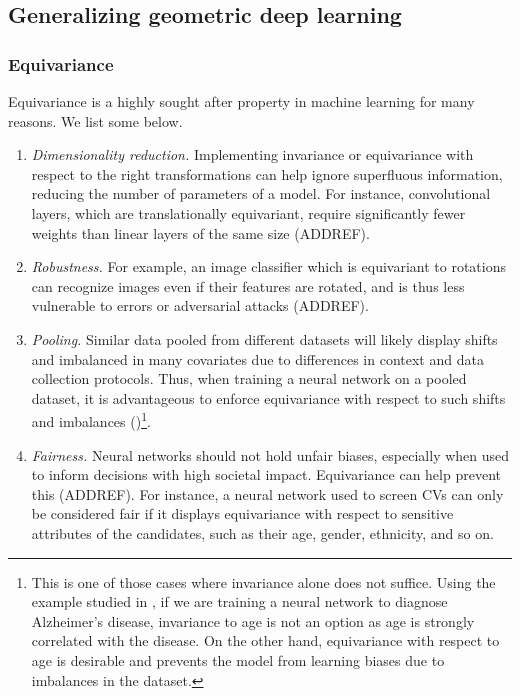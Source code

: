 \documentclass[12pt,a4paper,openright,twoside]{report}
\theoremstyle{plain}
\theoremstyle{definition}
\begin{document}
\subsection{Generalizing geometric deep learning}

\subsubsection{Equivariance}

Equivariance is a highly sought after property in machine learning for many reasons. We list some below.
\begin{enumerate}
  \item \textit{Dimensionality reduction.} Implementing invariance or equivariance with respect to the right transformations can help ignore superfluous information, reducing the number of parameters of a model. For instance, convolutional layers, which are translationally equivariant, require significantly fewer weights than linear layers of the same size (ADDREF).
  \item \textit{Robustness.} For example, an image classifier which is equivariant to rotations can recognize images even if their features are rotated, and is thus less vulnerable to errors or adversarial attacks (ADDREF).
  \item \textit{Pooling.} Similar data pooled from different datasets will likely display shifts and imbalanced in many covariates due to differences in context and data collection protocols. Thus, when training a neural network on a pooled dataset, it is advantageous to enforce equivariance with respect to such shifts and imbalances (\cite{chytas2024poolingimagedatasetsmultiple})\footnote{This is one of those cases where invariance alone does not suffice. Using the example studied in \cite{chytas2024poolingimagedatasetsmultiple}, if we are training a neural network to diagnose Alzheimer's disease, invariance to age is not an option as age is strongly correlated with the disease. On the other hand, equivariance with respect to age is desirable and prevents the model from learning biases due to imbalances in the dataset.}.
  \item \textit{Fairness.} Neural networks should not hold unfair biases, especially when used to inform decisions with high societal impact. Equivariance can help prevent this (ADDREF). For instance, a neural network used to screen CVs can only be considered fair if it displays equivariance with respect to sensitive attributes of the candidates, such as their age, gender, ethnicity, and so on.
\end{enumerate}
\end{document}
